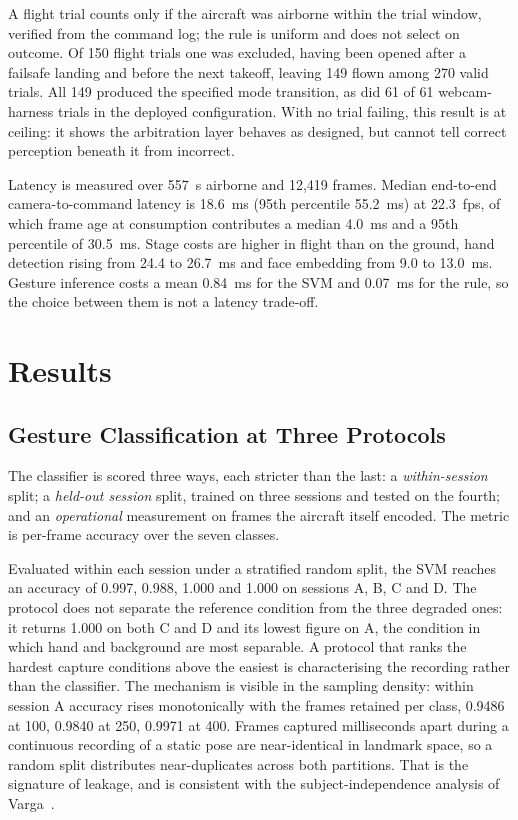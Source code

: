 \documentclass[conference]{IEEEtran}
\begin{document}
A flight trial counts only if the aircraft was airborne within the trial window,
verified from the command log; the rule is uniform and does not select on
outcome. Of 150 flight trials one was excluded, having been opened after a
failsafe landing and before the next takeoff, leaving 149 flown among 270 valid trials.
All 149 produced the specified mode transition, as did 61 of 61 webcam-harness
trials in the deployed configuration.
With no trial failing, this result is at ceiling: it shows the arbitration
layer behaves as designed, but cannot tell correct perception beneath it from
incorrect.

Latency is measured over 557~s airborne and 12{,}419 frames.
Median end-to-end camera-to-command latency is 18.6~ms (95th percentile
55.2~ms) at 22.3~fps, of which frame age at consumption contributes a median
4.0~ms and a 95th percentile of
30.5~ms.
Stage costs are higher in flight than on the ground, hand detection rising from
24.4 to 26.7~ms and face embedding from 9.0 to 13.0~ms.
Gesture inference costs a mean 0.84~ms for the SVM and 0.07~ms for the rule, so
the choice between them is not a latency trade-off.

\section{Results}
\label{sec:results}

\subsection{Gesture Classification at Three Protocols}
\label{sec:gesture}

The classifier is scored three ways, each stricter than the last: a
\emph{within-session} split; a \emph{held-out session} split, trained on three
sessions and tested on the fourth; and an \emph{operational} measurement on
frames the aircraft itself encoded. The metric is per-frame accuracy over the
seven classes.

Evaluated within each session under a stratified random split, the SVM reaches an accuracy of 
0.997, 0.988, 1.000 and 1.000 on sessions A, B, C and D.
The protocol does not separate the reference condition from the three degraded
ones: it returns 1.000 on both C and D and its lowest figure on A, the condition
in which hand and background are most separable.
A protocol that ranks the hardest capture conditions above the easiest is
characterising the recording rather than the classifier.
The mechanism is visible in the sampling density: within session A accuracy
rises monotonically with the frames retained per class, 0.9486 at 100, 0.9840 at
250, 0.9971 at 400.
Frames captured milliseconds apart during a continuous recording of a static
pose are near-identical in landmark space, so a random split distributes
near-duplicates across both partitions.
That is the signature of leakage, and is consistent with the
subject-independence analysis of Varga~\cite{varga2026}.
\end{document}
